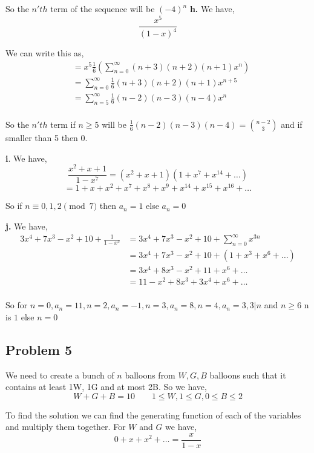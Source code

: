 \documentclass[a4paper]{report}
\begin{document}
So the $n'th$ term of the sequence will be  $(-4)^n$
\textbf{h.} We have, 
$$ \frac{x^{5}}{(1 - x)^{4}}$$ 


We can write this as, 
\begin{align*}
&= x^{5} \frac{1}{6}(\sum_{n=0}^{\infty} (n + 3)(n +  2)(n + 1) x^{n})\\
&= \sum_{n=0}^{\infty} \frac{1}{6}(n + 3)(n +  2)(n + 1) x^{n + 5}\\
&= \sum_{n=5}^{\infty} \frac{1}{6} (n - 2 )(n - 3)(n - 4) x^{n}\\
\end{align*}

So the $n'th$ term if $n \ge 5$  will be $\frac{1}{6}(n - 2)(n - 3)(n - 4) = {n - 2 \choose 3}$ and if smaller than 5 then 0.


\textbf{i}. We have, 
$$ \frac{x^2 + x + 1}{1- x^{7}}  = (x^2 + x + 1) (1 + x^{7} + x^{14} + \dots)$$ 
$$ = 1 + x + x^2 + x^{7} + x^{8} + x^{9} + x^{14} + x^{15} + x^{16} + \dots$$ 

So if $n \equiv 0,1,2 \pmod 7$ then  $a_n = 1$ else $a_n = 0$

\textbf{j.}  We have, 
\begin{align*}
    3x^{4} + 7x^{3} - x^2 + 10 + \frac{1}{1 - x^{3}} &= 3x^{4} + 7x^{3} - x^2 + 10 + \sum_{n=0}^{\infty} x^{3n}\\
                                                     &= 3x^{4} + 7x^{3} - x^2 + 10  +(1 + x^{3} + x^{6} + \dots)\\
                                                     &= 3x^{4} + 8x^{3} - x^2 + 11 + x^{6} + \dots\\
                                                     &=11 - x^2+ 8x^{3} + 3x^{4}  + x^{6} + \dots\\
\end{align*}

So for $n = 0, a_n = 11, n = 2, a_n = -1, n = 3, a_n = 8, n = 4, a_n = 3, 3 | n $ and  $n \ge 6$  n is $1$ else  $n =0$
\subsection*{Problem 5}

We need to create a bunch of $n$ balloons from $W, G, B$ balloons such that it contains at least 1W, 1G and at most 2B. So we have, 
$$ W + G + B = 10 \qquad 1\le W, 1\le G, 0 \le B \le 2$$ 

To find the solution we can find the generating function of each of the variables and multiply them together. For $W$ and $G$ we have, 
$$ 0 + x + x^2 + \dots = \frac{x}{1 - x}$$ 
\end{document}
